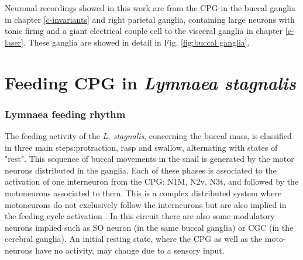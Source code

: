 Neuronal recordings showed in this work are from the CPG in the buccal ganglia in chapter \ref{c-invariants} and right parietal ganglia, containing large neurons with tonic firing and a giant electrical couple cell to the visceral ganglia in chapter \ref{c-laser}. These ganglia are showed in detail in Fig. \ref{fig:buccal ganglia}.



\section{Feeding CPG in \textit{Lymnaea stagnalis}}
\subsubsection{Lymnaea feeding rhythm}

The feeding activity of the \textit{L. stagnalis}, concerning the buccal mass, is classified in three main steps:protraction, rasp and swallow, alternating with states of "rest". This sequence of buccal movements in the snail is generated by the motor neurons distributed in the ganglia. Each of these phases is associated to the activation of one interneuron from the CPG: N1M, N2v, N3t, and followed by the motoneurons associated to them. This is a complex distributed system where motoneurons do not exclusively follow the interneurons but are also implied in the feeding cycle activation \parencite{staras_patterngenerating_1998}. In this circuit there are also some modulatory neurons implied such as SO neuron (in the same buccal ganglia) or CGC (in the cerebral ganglia). An initial resting state, where the CPG as well as the moto-neurons have no activity, may change due to a sensory input.


